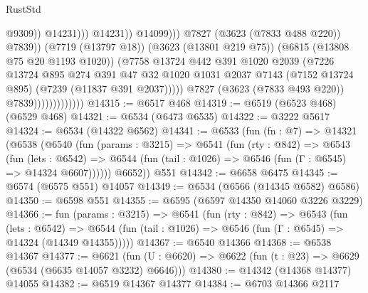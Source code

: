 \begin{lexlean}{RustStd}
\begin{coremodule}
                                                        @9309))
                                                    @14231)))
                                              @14231))
                                          @14099)))
                                    @7827
                                    (@3623 (@7833 @488 @220))
                                    @7839))
                                (@7719 (@13797 @18))
                                (@3623 (@13801 @219 @75))
                                (@6815 (@13808 @75 @20 @1193 @1020))
                                (@7758
                                  @13724
                                  @442
                                  @391
                                  @1020
                                  @2039
                                  (@7226
                                    @13724
                                    @895
                                    @274
                                    @391
                                    @47
                                    @32
                                    @1020
                                    @1031
                                    @2037
                                    @7143
                                    (@7152 @13724 @895)
                                    (@7239 (@11837 @391 @2037)))))
                              @7827
                              (@3623 (@7833 @493 @220))
                              @7839)))))))))))))
@14315 := @6517 @468
@14319 := @6519 (@6523 @468) (@6529 @468)
@14321 := @6534 (@6473 @6535)
@14322 := @3222 @5617
@14324 := @6534 (@14322 @6562)
@14341 := @6533
    (fun (fn : @7) =>
    @14321
      (@6538
        (@6540
          (fun (params : @3215) =>
          @6541
            (fun (rty : @842) =>
            @6543
              (fun (lets : @6542) =>
              @6544 (fun (tail : @1026) => @6546 (fun (Γ : @6545) => @14324 @6607))))))
        @6652))
    @551
@14342 := @6658 @6475
@14345 := @6574 (@6575 @551) @14057
@14349 := @6534 (@6566 (@14345 @6582) @6586)
@14350 := @6598 @551
@14355 := @6595 (@6597 @14350 @14060 @3226 @3229)
@14366 := fun (params : @3215) =>
  @6541
    (fun (rty : @842) =>
    @6543
      (fun (lets : @6542) =>
      @6544 (fun (tail : @1026) => @6546 (fun (Γ : @6545) => @14324 (@14349 @14355)))))
@14367 := @6540 @14366
@14368 := @6538 @14367
@14377 := @6621
    (fun (U : @6620) => @6622 (fun (t : @23) => @6629 (@6534 (@6635 @14057 @3232) @6646)))
@14380 := @14342 (@14368 @14377) @14055
@14382 := @6519 @14367 @14377
@14384 := @6703 @14366 @2117

\end{coremodule}
\end{lexlean}
